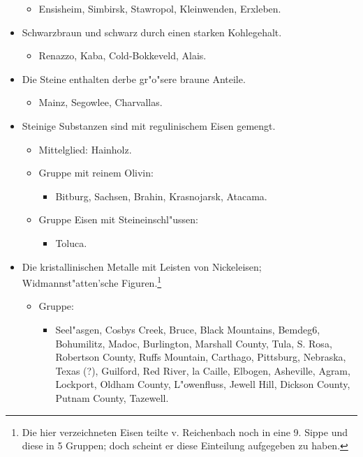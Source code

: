 \documentclass[a4paper, 11pt, oneside]{article}
\begin{document}
\begin{itemize}
\begin{itemize}
        \item Ensisheim, Simbirsk, Stawropol, Kleinwenden, Erxleben.
    \end{itemize}
    \item[5. Sippe.] Schwarzbraun und schwarz durch einen starken Kohlegehalt.
    \begin{itemize}
        \item Renazzo, Kaba, Cold-Bokkeveld, Alais.
    \end{itemize}
    \item[6. Sippe.] Die Steine enthalten derbe gr"o"sere braune Anteile.
    \begin{itemize}
        \item Mainz, Segowlee, Charvallas.
    \end{itemize}
    \item[7. Sippe.] Steinige Substanzen sind mit regulinischem Eisen gemengt.
    \begin{itemize}
        \item Mittelglied: Hainholz.
        \item[1.] Gruppe mit reinem Olivin:
        \begin{itemize}
            \item Bitburg, Sachsen, Brahin, Krasnojarsk, Atacama.
        \end{itemize}
        \item[2.] Gruppe Eisen mit Steineinschl"ussen:
        \begin{itemize}
            \item Toluca.
        \end{itemize}
    \end{itemize}
    \item[8. Sippe.] Die kristallinischen Metalle mit Leisten von Nickeleisen; Widmannst"atten'sche Figuren.\footnote{Die hier verzeichneten Eisen teilte v. Reichenbach noch in eine 9. Sippe und diese in 5 Gruppen; doch scheint er diese Einteilung aufgegeben zu haben.}
    \begin{itemize}
        \item[1.] Gruppe:
        \begin{itemize}
            \item Seel"asgen, Cosbys Creek, Bruce, Black Mountains, Bemdeg6, Bohumilitz, Madoc, Burlington, Marshall County, Tula, S. Rosa, Robertson County, Ruffs Mountain, Carthago, Pittsburg, Nebraska, Texas (?), Guilford, Red River, la Caille, Elbogen, Asheville, Agram, Lockport, Oldham County, L"owenfluss, Jewell Hill, Dickson County, Putnam County, Tazewell.

\end{itemize}
\end{itemize}
\end{itemize}
\end{document}
